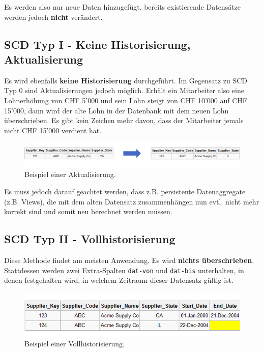 \documentclass[a4paper, 11pt, nofootinbib]{article}
\newcommand{\code}[1]{\texttt{#1}}
\begin{document}
\vspace{10px}

\noindent Es werden also nur neue Daten hinzugefügt, bereits existierende Datensätze werden jedoch \textbf{nicht} verändert.

\subsection{SCD Typ I - Keine Historisierung, Aktualisierung}
Es wird ebenfalls\textbf{ keine Historisierung} durchgeführt. Im Gegensatz zu SCD Typ 0 sind Aktualisierungen jedoch möglich. Erhält ein Mitarbeiter also eine Lohnerhöhung von CHF 5'000 und sein Lohn steigt von CHF 10'000 auf CHF 15'000, dann wird der alte Lohn in der Datenbank mit dem neuen Lohn überschrieben. Es gibt kein Zeichen mehr davon, dass der Mitarbeiter jemals nicht CHF 15'000 verdient hat.

\begin{figure}[htb]
	\centering
	\includegraphics[keepaspectratio=true,height=4\baselineskip]{scd_type1.png}
	\caption{Beispiel einer Aktualisierung.}
	\label{fig:scd1}
\end{figure}

Es muss jedoch darauf geachtet werden, dass z.B. persistente Datenaggregate (z.B. Views), die mit dem alten Datensatz zusammenhängen nun evtl. nicht mehr korrekt sind und somit neu berechnet werden müssen.

\subsection{SCD Typ II - Vollhistorisierung}
Diese Methode findet am meisten Anwendung. Es wird \textbf{nichts überschrieben}. Stattdessen werden zwei Extra-Spalten \code{dat-von} und \code{dat-bis} unterhalten, in denen festgehalten wird, in welchem Zeitraum dieser Datensatz gültig ist.

\begin{figure}[htb]
	\centering
	\includegraphics[keepaspectratio=true,height=5\baselineskip]{scd_type2.png}
	\caption{Beispiel einer Vollhistorisierung.}
	\label{fig:scd2}
\end{figure}
\end{document}
